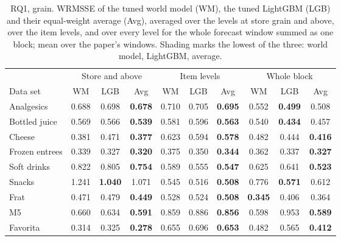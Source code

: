 \begin{table}[t]
\centering\footnotesize\setlength{\tabcolsep}{3pt}
\caption{RQ1, grain. WRMSSE of the tuned world model (WM), the tuned LightGBM (LGB) and their equal-weight average
(Avg), averaged over the levels at store grain and above, over the item levels, and over every level for the whole
forecast window summed as one block; mean over the paper's windows. Shading marks the lowest of the three: \colorbox{wmcell}{world model}, \colorbox{lgbcell}{LightGBM}, \colorbox{avgcell}{average}.}
\label{tab:rq-grain}
\begin{adjustbox}{max width=\textwidth}\begin{tabular}{l ccc ccc ccc}
\toprule
 & \multicolumn{3}{c}{Store and above} & \multicolumn{3}{c}{Item levels} & \multicolumn{3}{c}{Whole block}\\
\cmidrule(lr){2-4}\cmidrule(lr){5-7}\cmidrule(lr){8-10}
Data set & WM & LGB & Avg & WM & LGB & Avg & WM & LGB & Avg\\
\midrule
Analgesics & 0.688 & 0.698 & \cellcolor{avgcell}\textbf{0.678} & 0.710 & 0.705 & \cellcolor{avgcell}\textbf{0.695} & 0.552 & \cellcolor{lgbcell}\textbf{0.499} & 0.508 \\
Bottled juice & 0.569 & 0.566 & \cellcolor{avgcell}\textbf{0.539} & 0.581 & 0.596 & \cellcolor{avgcell}\textbf{0.563} & 0.540 & \cellcolor{lgbcell}\textbf{0.434} & 0.457 \\
Cheese & 0.381 & 0.471 & \cellcolor{avgcell}\textbf{0.377} & 0.623 & 0.594 & \cellcolor{avgcell}\textbf{0.578} & 0.482 & 0.444 & \cellcolor{avgcell}\textbf{0.416} \\
Frozen entrees & 0.339 & 0.327 & \cellcolor{avgcell}\textbf{0.320} & 0.375 & 0.350 & \cellcolor{avgcell}\textbf{0.344} & 0.362 & 0.337 & \cellcolor{avgcell}\textbf{0.327} \\
Soft drinks & 0.822 & 0.805 & \cellcolor{avgcell}\textbf{0.754} & 0.589 & 0.555 & \cellcolor{avgcell}\textbf{0.547} & 0.625 & 0.641 & \cellcolor{avgcell}\textbf{0.523} \\
Snacks & 1.241 & \cellcolor{lgbcell}\textbf{1.040} & 1.071 & 0.545 & 0.516 & \cellcolor{avgcell}\textbf{0.508} & 0.776 & \cellcolor{lgbcell}\textbf{0.571} & 0.612 \\
Frat & 0.471 & 0.479 & \cellcolor{avgcell}\textbf{0.449} & 0.528 & 0.524 & \cellcolor{avgcell}\textbf{0.508} & \cellcolor{wmcell}\textbf{0.345} & 0.406 & 0.364 \\
M5 & 0.660 & 0.634 & \cellcolor{avgcell}\textbf{0.591} & 0.859 & 0.886 & \cellcolor{avgcell}\textbf{0.856} & 0.598 & 0.953 & \cellcolor{avgcell}\textbf{0.589} \\
Favorita & 0.314 & 0.325 & \cellcolor{avgcell}\textbf{0.278} & 0.655 & 0.696 & \cellcolor{avgcell}\textbf{0.653} & 0.482 & 0.565 & \cellcolor{avgcell}\textbf{0.412} \\
\bottomrule
\end{tabular}\end{adjustbox}
\end{table}
